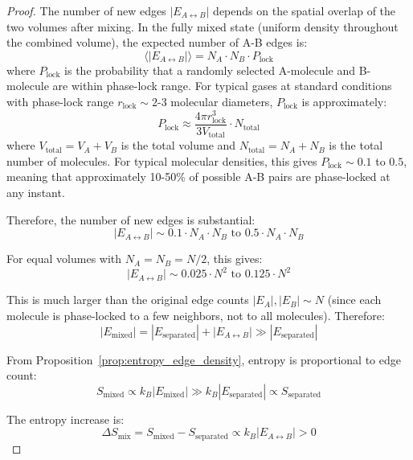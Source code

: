 \documentclass[12pt,a4paper]{article}
\theoremstyle{definition}
\theoremstyle{remark}
\begin{document}
\begin{proof}
The number of new edges $|E_{A \leftrightarrow B}|$ depends on the spatial overlap of the two volumes after mixing. In the fully mixed state (uniform density throughout the combined volume), the expected number of A-B edges is:
\begin{equation}
\langle |E_{A \leftrightarrow B}| \rangle = N_A \cdot N_B \cdot P_{\text{lock}}
\end{equation}
where $P_{\text{lock}}$ is the probability that a randomly selected A-molecule and B-molecule are within phase-lock range. For typical gases at standard conditions with phase-lock range $r_{\text{lock}} \sim 2$-$3$ molecular diameters, $P_{\text{lock}}$ is approximately:
\begin{equation}
P_{\text{lock}} \approx \frac{4\pi r_{\text{lock}}^3}{3V_{\text{total}}} \cdot N_{\text{total}}
\end{equation}
where $V_{\text{total}} = V_A + V_B$ is the total volume and $N_{\text{total}} = N_A + N_B$ is the total number of molecules. For typical molecular densities, this gives $P_{\text{lock}} \sim 0.1$ to $0.5$, meaning that approximately 10-50\% of possible A-B pairs are phase-locked at any instant.

Therefore, the number of new edges is substantial:
\begin{equation}
|E_{A \leftrightarrow B}| \sim 0.1 \cdot N_A \cdot N_B \text{ to } 0.5 \cdot N_A \cdot N_B
\end{equation}

For equal volumes with $N_A = N_B = N/2$, this gives:
\begin{equation}
|E_{A \leftrightarrow B}| \sim 0.025 \cdot N^2 \text{ to } 0.125 \cdot N^2
\end{equation}

This is much larger than the original edge counts $|E_A|, |E_B| \sim N$ (since each molecule is phase-locked to a few neighbors, not to all molecules). Therefore:
\begin{equation}
|E_{\text{mixed}}| = |E_{\text{separated}}| + |E_{A \leftrightarrow B}| \gg |E_{\text{separated}}|
\end{equation}

From Proposition~\ref{prop:entropy_edge_density}, entropy is proportional to edge count:
\begin{equation}
S_{\text{mixed}} \propto k_B |E_{\text{mixed}}| \gg k_B |E_{\text{separated}}| \propto S_{\text{separated}}
\end{equation}

The entropy increase is:
\begin{equation}
\Delta S_{\text{mix}} = S_{\text{mixed}} - S_{\text{separated}} \propto k_B |E_{A \leftrightarrow B}| > 0
\end{equation}


\end{proof}
\end{document}
